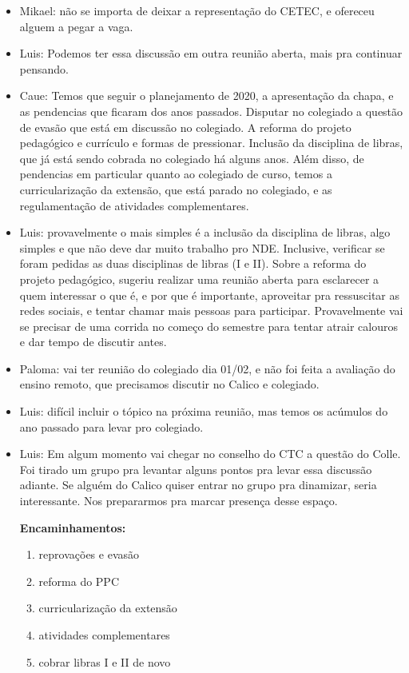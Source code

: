 \documentclass{ata-calico}
\begin{document}
\begin{itemize}
\item Mikael: não se importa de deixar a representação do CETEC, e ofereceu alguem a pegar a vaga.

\item Luis: Podemos ter essa discussão em outra reunião aberta, mais pra continuar pensando.

\item Caue: Temos que seguir o planejamento de 2020, a apresentação da chapa, e as pendencias que ficaram dos anos passados. Disputar no colegiado a questão de evasão que está em discussão no colegiado.
A reforma do projeto pedagógico e currículo e formas de pressionar.  Inclusão da disciplina de libras, que já está sendo cobrada no colegiado há alguns anos. Além disso, de pendencias em particular quanto ao colegiado de curso, temos a curricularização da extensão, que está parado no colegiado, e as regulamentação de atividades complementares.

\item Luis: provavelmente o mais simples é a inclusão da disciplina de libras, algo simples e que não deve dar muito trabalho pro NDE.
Inclusive, verificar se foram pedidas as duas disciplinas de libras (I e II).
Sobre a reforma do projeto pedagógico, sugeriu realizar uma reunião aberta para esclarecer a quem interessar o que é, e por que é importante,
aproveitar pra ressuscitar as redes sociais, e  tentar chamar mais pessoas para participar. Provavelmente vai se precisar de uma corrida no começo
do semestre para tentar atrair calouros e dar tempo de discutir antes.

\item Paloma: vai ter reunião do colegiado dia 01/02, e não foi feita a avaliação do ensino remoto, que precisamos discutir no Calico e colegiado.

\item Luis: difícil incluir o tópico na próxima reunião, mas temos os acúmulos do ano passado para levar pro colegiado.

\item Luis: Em algum momento vai chegar no conselho do CTC a questão do Colle. Foi tirado um grupo pra levantar alguns pontos pra levar essa discussão adiante.
Se alguém do Calico quiser entrar no grupo pra dinamizar, seria interessante. Nos prepararmos pra marcar presença desse espaço. \newline

\textbf{Encaminhamentos:}
\begin{enumerate}
\item reprovações e evasão

\item reforma do PPC

\item curricularização da extensão

\item atividades complementares

\item cobrar libras I e II de novo

\end{enumerate}
\end{itemize}
\end{document}
